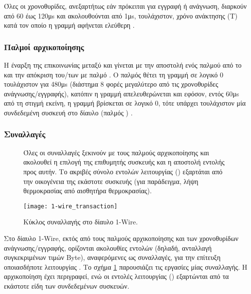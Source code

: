 Όλες οι χρονοθυρίδες, ανεξαρτήτως εάν πρόκειται για εγγραφή ή ανάγνωση, διαρκούν
από 60 έως 120μs και ακολουθούνται από 1μs, τουλάχιστον, χρόνο ανάκτησης
(T) κατά τον οποίο η γραμμή αφήνεται ελεύθερη
\parencites[15--16]{ds18b20}[2]{atmel04}.


\subsubsection{Παλμοί αρχικοποίησης}
\label{ssubsec:1-wire:initialisation}

Η έναρξη της επικοινωνίας μεταξύ  και  γίνεται με την
αποστολή ενός παλμού  από το  και την απόκριση
του\slash{}των  με παλμό  \parencite[15]{ds18b20}. Ο
παλμός  θέτει τη γραμμή σε λογικό 0 τουλάχιστον για 480μs (διάστημα 8
φορές μεγαλύτερο από τις χρονοθυρίδες ανάγνωσης\slash{}εγγραφής), κατόπιν η
γραμμή απελευθερώνεται και εφόσον, εντός 60μs από τη στιγμή εκείνη, η γραμμή
βρίσκεται σε λογικό 0, τότε υπάρχει τουλάχιστον μία συνδεδεμένη 
συσκευή στο δίαυλο (παλμός ) \parencite[3]{atmel04}.


\subsubsection{Συναλλαγές}

\begin{figure}
    \caption{Κύκλος συναλλαγής στο δίαυλο 1-Wire.
    \label{fig:1-wire:transaction}}
    Όλες οι συναλλαγές ξεκινούν με τους παλμούς αρχικοποίησης και ακολουθεί η
    επιλογή της επιθυμητής  συσκευής και η αποστολή εντολής προς
    αυτήν. Το ακριβές σύνολο εντολών λειτουργίας ()
    εξαρτάται από την οικογένεια της εκάστοτε συσκευής (για παράδειγμα, λήψη
    θερμοκρασίας από αισθητήρα θερμοκρασίας).
    \begin{center}
    \texttt{[image: 1-wire\_transaction]}
    \end{center}
\end{figure}

Στο δίαυλο 1-Wire, εκτός από τους παλμούς αρχικοποίησης και των χρονοθυρίδων
ανάγνωσης\slash{}εγγραφής, ορίζονται ακολουθίες εντολών (δηλαδή, ανταλλαγή
συγκεκριμένων τιμών Byte), αναφερόμενες ως συναλλαγές, για την επίτευξη
οποιασδήποτε λειτουργίας \parencite[10]{ds18b20}. Το σχήμα
\ref{fig:1-wire:transaction} παρουσιάζει τις εργασίες μίας συναλλαγής.
Η αρχικοποίηση έχει περιγραφεί, ενώ οι εντολές λειτουργίας
() εξαρτώνται από τα εκάστοτε είδη των συνδεδεμένων
συσκευών.

